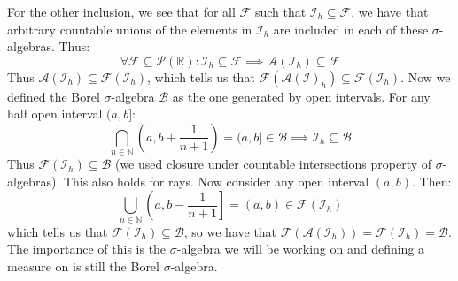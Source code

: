 \documentclass[10pt,letterpaper]{article} %
\begin{document}
For the other inclusion, we see that for all $\mathcal{F}$ such that $\mathcal{I}_h \subseteq \mathcal{F}$, we have that arbitrary countable unions of the elements in $\mathcal{I}_h$ are included in each of these $\sigma$-algebras. Thus:
\begin{equation*}
\forall \mathcal{F} \subseteq \mathcal{P}(\mathbb{R}): \mathcal{I}_h \subseteq \mathcal{F} \implies \mathcal{A}(\mathcal{I}_h) \subseteq \mathcal{F}
\end{equation*} 
Thus $\mathcal{A}(\mathcal{I}_h) \subseteq \mathcal{F}(\mathcal{I}_h)$, which tells us that $\mathcal{F}(\mathcal{A}(\mathcal{I})_h) \subseteq \mathcal{F}(\mathcal{I}_h)$. Now we defined the Borel $\sigma$-algebra $\mathcal{B}$ as the one generated by open intervals. For any half open interval $(a, b]$:
\begin{equation*}
\bigcap_{n \in \mathbb{N}}\left(a, b + \frac{1}{n+1}\right) = (a, b] \in \mathcal{B} \implies \mathcal{I}_h \subseteq \mathcal{B}
\end{equation*} 
Thus $\mathcal{F}(\mathcal{I}_h) \subseteq \mathcal{B}$ (we used closure under countable intersections property of $\sigma$-algebras). This also holds for rays. Now consider any open interval $(a, b)$. Then:
\begin{equation*}
\bigcup_{n \in \mathbb{N}}\left(a, b - \frac{1}{n+1}\right] = (a, b) \in \mathcal{F}(\mathcal{I}_h)
\end{equation*}
which tells us that $\mathcal{F}(\mathcal{I}_h) \subseteq \mathcal{B}$, so we have that $\mathcal{F}(\mathcal{A}(\mathcal{I}_h)) = \mathcal{F}(\mathcal{I}_h) = \mathcal{B}$. The importance of this is the $\sigma$-algebra we will be working on and defining a measure on is still the Borel $\sigma$-algebra.
\end{document}
